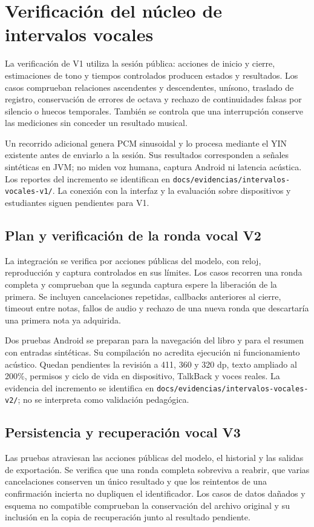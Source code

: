 \section{Verificación del núcleo de intervalos vocales}
La verificación de V1 utiliza la sesión pública: acciones de inicio y cierre,
estimaciones de tono y tiempos controlados producen estados y resultados.
Los casos comprueban relaciones ascendentes y descendentes, unísono,
traslado de registro, conservación de errores de octava y rechazo de
continuidades falsas por silencio o huecos temporales. También se controla
que una interrupción conserve las mediciones sin conceder un resultado musical.

Un recorrido adicional genera PCM sinusoidal y lo procesa mediante el YIN
existente antes de enviarlo a la sesión. Sus resultados corresponden a señales
sintéticas en JVM; no miden voz humana, captura Android ni latencia acústica.
Los reportes del incremento se identifican en
\texttt{docs/evidencias/intervalos-vocales-v1/}. La conexión con la interfaz y
la evaluación sobre dispositivos y estudiantes siguen pendientes para V1.

\subsection{Plan y verificación de la ronda vocal V2}
La integración se verifica por acciones públicas del modelo, con reloj,
reproducción y captura controlados en sus límites. Los casos recorren una
ronda completa y comprueban que la segunda captura espere la liberación de
la primera. Se incluyen cancelaciones repetidas, callbacks anteriores al
cierre, timeout entre notas, fallos de audio y rechazo de una nueva ronda
que descartaría una primera nota ya adquirida.

Dos pruebas Android se preparan para la navegación del libro y para el
resumen con entradas sintéticas. Su compilación no acredita ejecución ni
funcionamiento acústico. Quedan pendientes la revisión a 411, 360 y 320 dp,
texto ampliado al 200\%, permisos y ciclo de vida en dispositivo, TalkBack
y voces reales. La evidencia del incremento se identifica en
\texttt{docs/evidencias/intervalos-vocales-v2/}; no se interpreta como
validación pedagógica.

\subsection{Persistencia y recuperación vocal V3}
Las pruebas atraviesan las acciones públicas del modelo, el historial y las
salidas de exportación. Se verifica que una ronda completa sobreviva a reabrir,
que varias cancelaciones conserven un único resultado y que los reintentos de
una confirmación incierta no dupliquen el identificador. Los casos de datos
dañados y esquema no compatible comprueban la conservación del archivo original
y su inclusión en la copia de recuperación junto al resultado pendiente.

